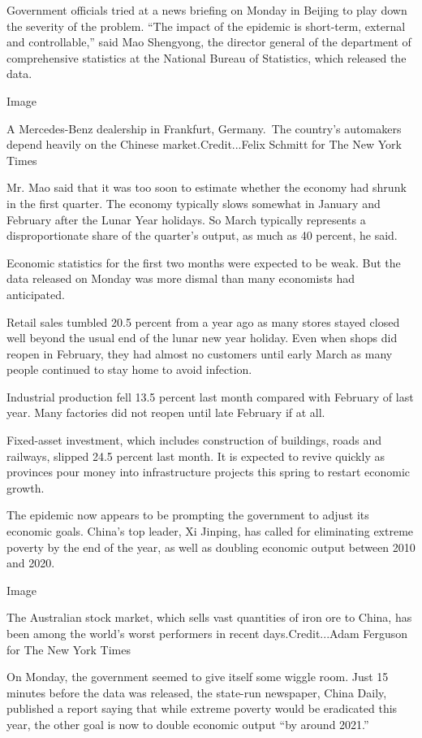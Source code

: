 Government officials tried at a news briefing on Monday in Beijing to
play down the severity of the problem. ``The impact of the epidemic is
short-term, external and controllable,'' said Mao Shengyong, the
director general of the department of comprehensive statistics at the
National Bureau of Statistics, which released the data.

Image

A Mercedes-Benz dealership in Frankfurt, Germany.~The country's
automakers depend heavily on the Chinese market.Credit...Felix Schmitt
for The New York Times

Mr. Mao said that it was too soon to estimate whether the economy had
shrunk in the first quarter. The economy typically slows somewhat in
January and February after the Lunar Year holidays. So March typically
represents a disproportionate share of the quarter's output, as much as
40 percent, he said.

Economic statistics for the first two months were expected to be weak.
But the data released on Monday was more dismal than many economists had
anticipated.

Retail sales tumbled 20.5 percent from a year ago as many stores stayed
closed well beyond the usual end of the lunar new year holiday. Even
when shops did reopen in February, they had almost no customers until
early March as many people continued to stay home to avoid infection.

Industrial production fell 13.5 percent last month compared with
February of last year. Many factories did not reopen until late February
if at all.

Fixed-asset investment, which includes construction of buildings, roads
and railways, slipped 24.5 percent last month. It is expected to revive
quickly as provinces pour money into infrastructure projects this spring
to restart economic growth.

The epidemic now appears to be prompting the government to adjust its
economic goals. China's top leader, Xi Jinping, has called for
eliminating extreme poverty by the end of the year, as well as doubling
economic output between 2010 and 2020.

Image

The Australian stock market, which sells vast quantities of iron ore to
China, has been among the world's worst performers in recent
days.Credit...Adam Ferguson for The New York Times

On Monday, the government seemed to give itself some wiggle room. Just
15 minutes before the data was released, the state-run newspaper, China
Daily, published a report saying that while extreme poverty would be
eradicated this year, the other goal is now to double economic output
``by around 2021.''

